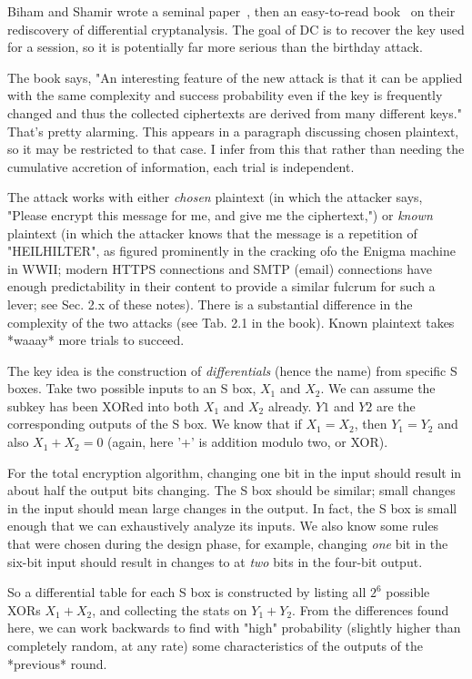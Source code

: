 Biham and Shamir wrote a seminal paper~\cite{biham1991differential},
then an easy-to-read book~\cite{biham1993differential-book} on their
rediscovery of differential cryptanalysis.  The goal of DC is to
recover the key used for a session, so it is potentially far more
serious than the birthday attack.

The book says, "An interesting feature of the new attack is that it
can be applied with the same complexity and success probability even
if the key is frequently changed and thus the collected ciphertexts
are derived from many different keys."  That's pretty alarming.  This
appears in a paragraph discussing chosen plaintext, so it may be
restricted to that case.  I infer from this that rather than needing
the cumulative accretion of information, each trial is independent.

The attack works with either \emph{chosen} plaintext (in which the attacker
says, "Please encrypt this message for me, and give me the
ciphertext,") or \emph{known} plaintext (in which the attacker knows that
the message is a repetition of "HEILHILTER", as figured prominently in
the cracking ofo the Enigma machine in WWII; modern HTTPS connections and
SMTP (email) connections have enough predictability in their content
to provide a similar fulcrum for such a lever; see Sec. 2.x of these
notes).  There is a substantial difference in the complexity of the
two attacks (see Tab. 2.1 in the book).  Known plaintext takes *waaay*
more trials to succeed.


The key idea is the construction of \emph{differentials} (hence the name)
from specific S boxes.  Take two possible inputs to an S box, $X_1$
and $X_2$.  We can assume the subkey has been XORed into both $X_1$
and $X_2$ already.  $Y1$ and $Y2$ are the corresponding outputs of the
S box.  We know that if $X_1 = X_2$, then $Y_1 = Y_2$ and also $X_1 +
X_2 = 0$ (again, here '+' is addition modulo two, or XOR).

For the total encryption algorithm, changing one bit in the input
should result in about half the output bits changing.  The S box
should be similar; small changes in the input should mean large
changes in the output.  In fact, the S box is small enough that we can
exhaustively analyze its inputs.  We also know some rules that were
chosen during the design phase, for example, changing \emph{one} bit in the
six-bit input should result in changes to at \emph{two} bits in the
four-bit output.

So a differential table for each S box is constructed by listing all
$2^6$ possible XORs $X_1 + X_2$, and collecting the stats on $Y_1 +
Y_2$.  From the differences found here, we can work backwards to find
with "high" probability (slightly higher than completely random, at
any rate) some characteristics of the outputs of the *previous* round.

